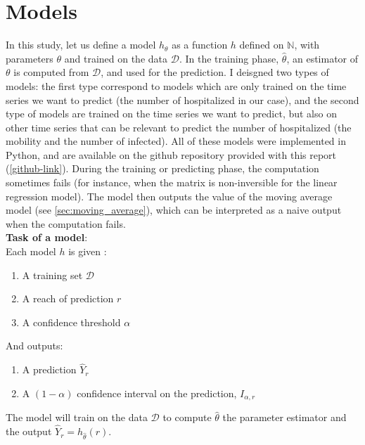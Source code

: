 \section{Models}



In this study, let us define a model ${h}_{\theta }$ as a function ${h}$  defined on $ \mathbb{N}$, with parameters $\theta$ and trained on the data $\mathcal{D}$.
In the training phase, $\hat{\theta}$,  an estimator of $\theta$ is computed from $\mathcal{D}$, and used for the prediction.  
I deisgned two types of models: the first type correspond to models which are only trained on the time series we want to predict (the number of hospitalized in our case), and the second type of models are trained on the time series we want to predict, but also on other time series that can be relevant to predict the number of hospitalized (the mobility and the number of infected). 
All of these models were implemented in Python, and are available on the github repository provided with this report (\ref{github-link}).
During the training or predicting phase, the computation sometimes fails (for instance, when the matrix is non-inversible for the linear regression model). 
The model then outputs the value of the moving average model (see \ref{sec:moving_average}), which can be interpreted as a naive output when the computation fails. \\[0.3cm]
\textbf{Task of a model}: \\

Each model ${h}$ is given : 

\begin{enumerate}
    \item A training set $\mathcal{D}$
    \item A reach of prediction $r$
    \item A confidence threshold $\alpha$
\end{enumerate}


And outputs: 

\begin{enumerate}
    \item A prediction $\hat{Y}_r$
    \item A $(1-\alpha)$ confidence interval on the prediction, $I_{\alpha, r}$
\end{enumerate}

The model will train on the data $\mathcal{D}$ to compute $\hat{\theta}$ the parameter estimator and the output $\hat{Y}_r = {h}_{\hat{\theta}}(r)$.


